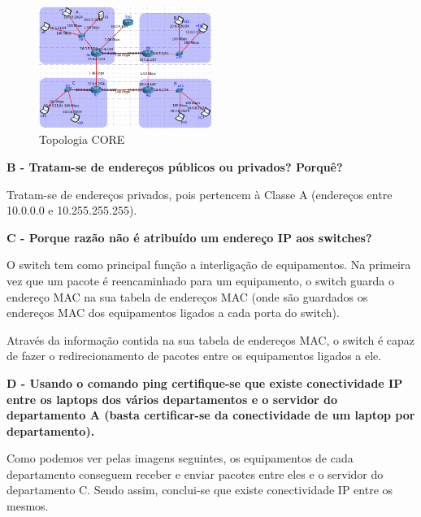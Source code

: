 \documentclass[11pt]{article}
\begin{document}
\begin{figure}[!htb]
    \centering
    \includegraphics[width=0.5\textwidth]{images/parte2/core.png}
    \caption{Topologia CORE}
\end{figure}

\clearpage
\textbf{B - Tratam-se de endereços públicos ou privados? Porquê?}

Tratam-se de endereços privados, pois pertencem à Classe A (endereços entre 10.0.0.0 e 10.255.255.255).

\vspace{0.5cm}

\textbf{C - Porque razão não é atribuído um endereço IP aos switches?}

O switch tem como principal função a interligação de equipamentos. Na primeira vez que um pacote é reencaminhado para um equipamento, o switch guarda o endereço MAC na sua tabela de endereços MAC (onde são guardados os endereços MAC dos equipamentos ligados a cada porta do switch).

Através da informação contida na sua tabela de endereços MAC, o switch é capaz de fazer o redirecionamento de pacotes entre os equipamentos ligados a ele.

\vspace{0.5cm}

\textbf{D - Usando o comando ping certifique-se que existe conectividade IP entre os laptops dos vários departamentos e o servidor do departamento A (basta certificar-se da conectividade de um laptop por departamento).}

Como podemos ver pelas imagens seguintes, os equipamentos de cada departamento conseguem receber e enviar pacotes entre eles e o servidor do departamento C. Sendo assim, conclui-se que existe conectividade IP entre os mesmos.
\end{document}
